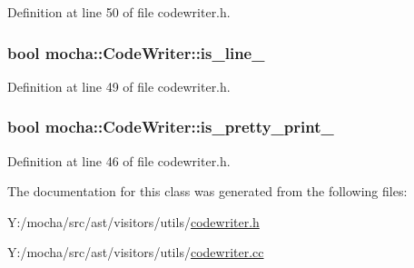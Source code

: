Definition at line 50 of file codewriter.h.

\hypertarget{classmocha_1_1_code_writer_ae3fba73309d6010b17ce1b6ec6a52e4d}{
\subsubsection[{is\_\-line\_\-}]{\setlength{\rightskip}{0pt plus 5cm}bool {\bf mocha::CodeWriter::is\_\-line\_\-}}}
\label{classmocha_1_1_code_writer_ae3fba73309d6010b17ce1b6ec6a52e4d}


Definition at line 49 of file codewriter.h.

\hypertarget{classmocha_1_1_code_writer_a500de5cadf77c987ccd3b2d51c9d4487}{
\subsubsection[{is\_\-pretty\_\-print\_\-}]{\setlength{\rightskip}{0pt plus 5cm}bool {\bf mocha::CodeWriter::is\_\-pretty\_\-print\_\-}}}
\label{classmocha_1_1_code_writer_a500de5cadf77c987ccd3b2d51c9d4487}


Definition at line 46 of file codewriter.h.



The documentation for this class was generated from the following files:\begin{DoxyCompactItemize}
\item 
Y:/mocha/src/ast/visitors/utils/\hyperlink{codewriter_8h}{codewriter.h}\item 
Y:/mocha/src/ast/visitors/utils/\hyperlink{codewriter_8cc}{codewriter.cc}\end{DoxyCompactItemize}
